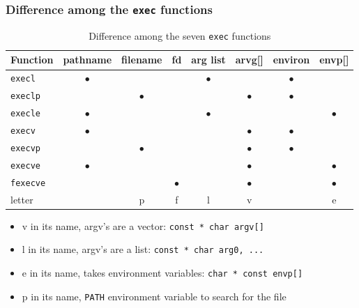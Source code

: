 \documentclass[newPxFont,sthlmFooter,nooffset]{beamer}
\begin{document}
\begin{frame}[t]
  \frametitle{Difference among the \texttt{exec} functions}
  \begin{table}[h]
    \centering\footnotesize
    \begin{tabular}{l | *{3}{ c | }| *{2} { c | } | c | c }
      Function & pathname & filename & fd & arg list & arvg[] & environ & envp[] \\ \hline
      \texttt{execl} & $\bullet$  &   &   & $\bullet$  &    & $\bullet$   &     \\
      \texttt{execlp} &   & $\bullet$  &   &   &  $\bullet$  & $\bullet$   &     \\
      \texttt{execle} & $\bullet$   &   &   & $\bullet$  &    &    & $\bullet$    \\
      \texttt{execv} & $\bullet$  &   &   &   &   $\bullet$ & $\bullet$   &     \\
      \texttt{execvp} &   & $\bullet$  &   &   &  $\bullet$  & $\bullet$   &     \\
      \texttt{execve} & $\bullet$  &   &   &   &  $\bullet$  &    &  $\bullet$   \\
      \texttt{fexecve} &   &   & $\bullet$  &   & $\bullet$   &    & $\bullet$    \\ \hline
      letter &   & p  & f   & l  &  v  &    & e    \\
    \end{tabular}
    \caption{Difference among the seven \texttt{exec} functions}
    \label{tab:diff-exec}
  \end{table}
  \begin{itemize}
  \item v in its name, argv's are a vector: \texttt{const * char argv[]}
  \item l in its name, argv's are a list: \texttt{const * char arg0, ...}
  \item e in its name, takes environment variables: \texttt{char * const envp[]}
  \item p in its name, \texttt{PATH} environment variable to search for the file
  \end{itemize}
\end{frame}
\end{document}
